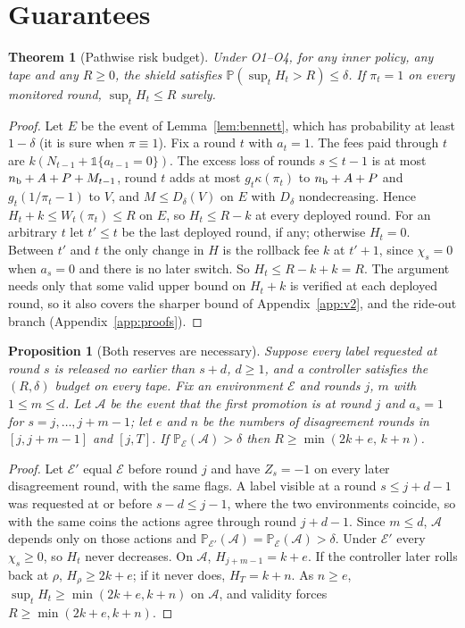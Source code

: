 \documentclass{article}
\theoremstyle{plain}
\newtheorem{theorem}{Theorem}
\newtheorem{proposition}{Proposition}
\theoremstyle{definition}
\newcommand{\PP}{\mathbb{P}}
\newcommand{\one}{\mathbb{1}}
\begin{document}
\section{Guarantees}\label{sec:theory}
\begin{theorem}[Pathwise risk budget]\label{thm:main}
Under O1--O4, for any inner policy, any tape and any $R\ge0$, the shield satisfies $\PP(\sup_tH_t>R)\le\delta$. If $\pi_t=1$ on every monitored round, $\sup_tH_t\le R$ surely.
\end{theorem}
\begin{proof}
Let $E$ be the event of Lemma~\ref{lem:bennett}, which has probability at least $1-\delta$ (it is sure when $\pi\equiv1$). Fix a round $t$ with $a_t=1$. The fees paid through $t$ are $k(N_{t-1}+\one\{a_{t-1}=0\})$. The excess loss of rounds $s\le t-1$ is at most $n_{\rm b}+A+P+M_{t-1}$, round $t$ adds at most $g_t\kappa(\pi_t)$ to $n_{\rm b}+A+P$ and $g_t(1/\pi_t-1)$ to $V$, and $M\le D_\delta(V)$ on $E$ with $D_\delta$ nondecreasing. Hence $H_t+k\le W_t(\pi_t)\le R$ on $E$, so $H_t\le R-k$ at every deployed round. For an arbitrary $t$ let $t'\le t$ be the last deployed round, if any; otherwise $H_t=0$. Between $t'$ and $t$ the only change in $H$ is the rollback fee $k$ at $t'+1$, since $\chi_s=0$ when $a_s=0$ and there is no later switch. So $H_t\le R-k+k=R$. The argument needs only that some valid upper bound on $H_t+k$ is verified at each deployed round, so it also covers the sharper bound of Appendix~\ref{app:v2}, and the ride-out branch (Appendix~\ref{app:proofs}).
\end{proof}

\begin{proposition}[Both reserves are necessary]\label{prop:reserves}
Suppose every label requested at round $s$ is released no earlier than $s+d$, $d\ge1$, and a controller satisfies the $(R,\delta)$ budget on every tape. Fix an environment $\mathcal E$ and rounds $j$, $m$ with $1\le m\le d$. Let $\mathcal A$ be the event that the first promotion is at round $j$ and $a_s=1$ for $s=j,\dots,j+m-1$; let $e$ and $n$ be the numbers of disagreement rounds in $[j,j+m-1]$ and $[j,T]$. If $\PP_{\mathcal E}(\mathcal A)>\delta$ then $R\ge\min(2k+e,\,k+n)$.
\end{proposition}
\begin{proof}
Let $\mathcal E'$ equal $\mathcal E$ before round $j$ and have $Z_s=-1$ on every later disagreement round, with the same flags. A label visible at a round $s\le j+d-1$ was requested at or before $s-d\le j-1$, where the two environments coincide, so with the same coins the actions agree through round $j+d-1$. Since $m\le d$, $\mathcal A$ depends only on those actions and $\PP_{\mathcal E'}(\mathcal A)=\PP_{\mathcal E}(\mathcal A)>\delta$. Under $\mathcal E'$ every $\chi_s\ge0$, so $H_t$ never decreases. On $\mathcal A$, $H_{j+m-1}=k+e$. If the controller later rolls back at $\rho$, $H_\rho\ge2k+e$; if it never does, $H_T=k+n$. As $n\ge e$, $\sup_tH_t\ge\min(2k+e,k+n)$ on $\mathcal A$, and validity forces $R\ge\min(2k+e,k+n)$.
\end{proof}
\end{document}
